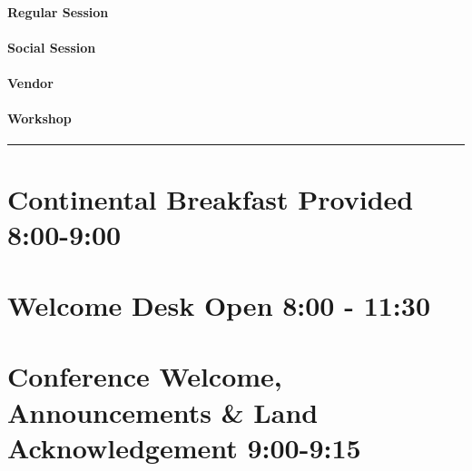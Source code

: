 \documentclass[
]{book}
\begin{document}
\begin{session}
\hypertarget{regular-session}{%
\paragraph{Regular Session}\label{regular-session}}
\end{session}

\begin{social}
\hypertarget{social-session}{%
\paragraph{Social Session}\label{social-session}}
\end{social}

\begin{vendor}
\hypertarget{vendor}{%
\paragraph{Vendor}\label{vendor}}
\end{vendor}

\begin{workshop}
\hypertarget{workshop}{%
\paragraph{Workshop}\label{workshop}}
\end{workshop}

\begin{center}\rule{0.5\linewidth}{0.5pt}\end{center}

\hypertarget{continental-breakfast-provided-800-900}{%
\section*{Continental Breakfast Provided \textbar{} 8:00-9:00}\label{continental-breakfast-provided-800-900}}

\hypertarget{welcome-desk-open-800---1130}{%
\section*{Welcome Desk Open \textbar{} 8:00 - 11:30}\label{welcome-desk-open-800---1130}}

\hypertarget{conference-welcome-announcements-land-acknowledgement-900-915}{%
\section*{Conference Welcome, Announcements \& Land Acknowledgement \textbar{} 9:00-9:15}\label{conference-welcome-announcements-land-acknowledgement-900-915}}
\end{document}
